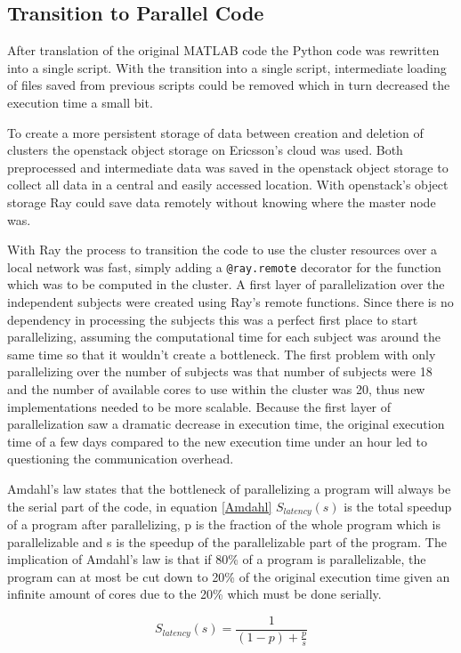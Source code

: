 \documentclass[12pt, a4paper]{article}
\begin{document}
\subsection{Transition to Parallel Code}
After translation of the original MATLAB code the Python code was
rewritten into a single script.
With the transition into a single script, intermediate loading of files saved from previous scripts could be removed which in turn decreased the execution time a small bit.

To create a more persistent storage of data between creation and deletion of clusters the openstack object storage on Ericsson's cloud was used.
Both preprocessed and intermediate data was saved in the openstack object storage to collect all data in a central and easily accessed location.
With openstack's object storage Ray could save data remotely without knowing where the master node was.

With Ray the process to transition the code to use the cluster resources over a local network was fast, simply adding a \texttt{@ray.remote} decorator for the function which was to be computed in the cluster.
A first layer of parallelization over the independent subjects were created using Ray's remote functions.
Since there is no dependency in processing the subjects this was a perfect first place to start parallelizing, assuming the computational time for each subject was around the same time so that it wouldn't create a bottleneck.
The first problem with only parallelizing over the number of subjects was that number of subjects were 18 and the number of available cores to use within the cluster was 20, thus new implementations needed to be more scalable.
Because the first layer of parallelization saw a dramatic decrease in execution time, the original execution time of a few days compared to the new execution time under an hour led to questioning the communication overhead.

Amdahl's law states that the bottleneck of parallelizing a program will always be the serial part of the code, in equation \eqref{Amdahl} $S_{latency}(s)$ is the total speedup of a program after parallelizing, p is the fraction of the whole program which is parallelizable and s is the speedup of the parallelizable part of the program.
The implication of Amdahl's law is that if 80\% of a program is parallelizable, the program can at most be cut down to 20\% of the original execution time given an infinite amount of cores due to the 20\% which must be done serially.

\begin{equation}\label{Amdahl}
    S_{latency}(s) = \frac{1}{(1-p) + \frac{p}{s}}
\end{equation}
\end{document}
